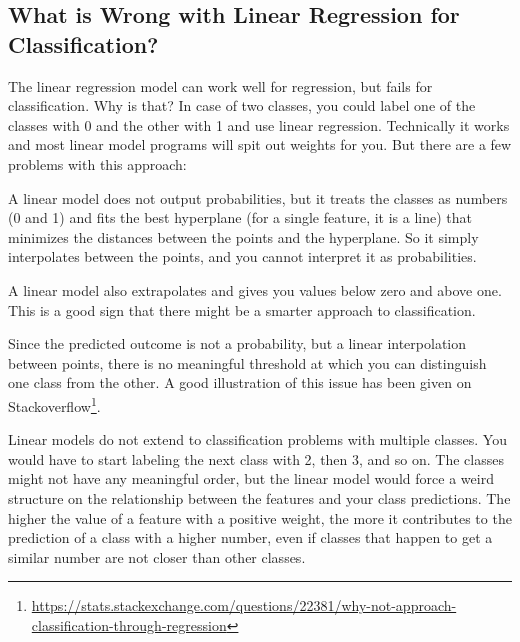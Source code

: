 \documentclass[
  11pt,
]{scrbook}
\renewcommand{\href}[2]{#2\footnote{\url{#1}}}
\begin{document}
\hypertarget{what-is-wrong-with-linear-regression-for-classification}{%
\subsection{What is Wrong with Linear Regression for Classification?}\label{what-is-wrong-with-linear-regression-for-classification}}

The linear regression model can work well for regression, but fails for classification.
Why is that?
In case of two classes, you could label one of the classes with 0 and the other with 1 and use linear regression.
Technically it works and most linear model programs will spit out weights for you.
But there are a few problems with this approach:

A linear model does not output probabilities, but it treats the classes as numbers (0 and 1) and fits the best hyperplane (for a single feature, it is a line) that minimizes the distances between the points and the hyperplane.
So it simply interpolates between the points, and you cannot interpret it as probabilities.

A linear model also extrapolates and gives you values below zero and above one.
This is a good sign that there might be a smarter approach to classification.

Since the predicted outcome is not a probability, but a linear interpolation between points, there is no meaningful threshold at which you can distinguish one class from the other.
A good illustration of this issue has been given on \href{https://stats.stackexchange.com/questions/22381/why-not-approach-classification-through-regression}{Stackoverflow}.

Linear models do not extend to classification problems with multiple classes.
You would have to start labeling the next class with 2, then 3, and so on.
The classes might not have any meaningful order, but the linear model would force a weird structure on the relationship between the features and your class predictions.
The higher the value of a feature with a positive weight, the more it contributes to the prediction of a class with a higher number, even if classes that happen to get a similar number are not closer than other classes.
\end{document}
